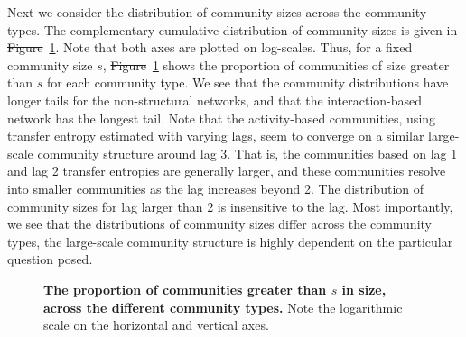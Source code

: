 \documentclass[10pt,letterpaper]{article}
\providecommand{\DIFadd}[1]{{\protect\color{blue}\uwave{#1}}} %
\providecommand{\DIFdel}[1]{{\protect\color{red}\sout{#1}}}                      %
\providecommand{\DIFaddbegin}{} %
\providecommand{\DIFaddend}{} %
\providecommand{\DIFdelbegin}{} %
\providecommand{\DIFdelend}{} %
\begin{document}
Next we consider the distribution of community sizes across the community types. The complementary cumulative distribution of community sizes is given in \DIFdelbegin \DIFdel{Figure}\DIFdelend \DIFaddbegin \DIFadd{Fig.}\DIFaddend ~\ref{Fig-community_size_distribution}. Note that both axes are plotted on log-scales. Thus, for a fixed community size $s$, \DIFdelbegin \DIFdel{Figure}\DIFdelend \DIFaddbegin \DIFadd{Fig.}\DIFaddend ~\ref{Fig-community_size_distribution} shows the proportion of communities of size greater than $s$ for each community type. We see that the community distributions have longer tails for the non-structural networks, and that the interaction-based network has the longest tail.
Note that the activity-based communities, using transfer entropy estimated with varying lags, seem to converge on a similar large-scale community structure around lag 3. That is, the communities based on lag 1 and lag 2 transfer entropies are generally larger, and these communities resolve into smaller communities as the lag increases beyond 2. The distribution of community sizes for lag larger than 2 is insensitive to the lag.
Most importantly, we see that the distributions of community sizes differ across the community types, the large-scale community structure is highly dependent on the particular question posed.

\begin{figure}[ht]
  \centering
\caption{\textbf{The proportion of communities greater than $s$ in size, across the different community types.} Note the logarithmic scale on the horizontal and vertical axes.}
\label{Fig-community_size_distribution}
\end{figure}

\end{document}
